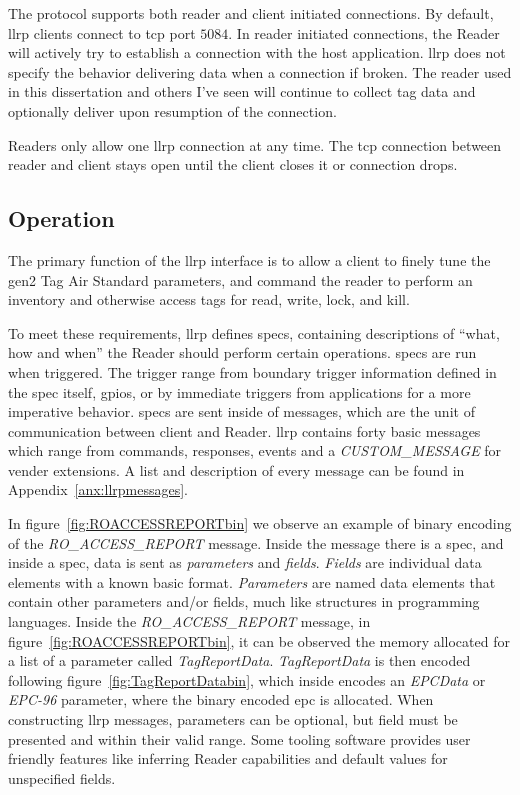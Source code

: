The protocol supports both reader and client initiated connections. By default, \ac{llrp} clients connect to \acs{tcp} port $5084$. In reader initiated connections, the Reader will actively try to establish a connection with the host application.
\ac{llrp} does not specify the behavior delivering data when a connection if broken. The reader used in this dissertation and others I've seen will continue to collect tag data and optionally deliver upon resumption of the connection.

Readers only allow one \ac{llrp} connection at any time. The \ac{tcp} connection between reader and client stays open until the client closes it or connection drops.

\subsection{Operation}

The primary function of the \ac{llrp} interface is to allow a client to finely tune the \ac{gen2} Tag Air Standard parameters, and command the reader to perform an inventory and otherwise access tags for read, write, lock, and kill.

To meet these requirements, \ac{llrp} defines \acp{spec}, containing descriptions of ``what, how and when'' the Reader should perform certain operations.
\acp{spec} are run when triggered. The trigger range from boundary trigger information defined in the \ac{spec} itself, \acp{gpio}, or by immediate triggers from applications for a more imperative behavior.
\acp{spec} are sent inside of messages, which are the unit of communication between client and Reader.
\ac{llrp} contains forty basic messages which range from commands, responses, events and a \textit{CUSTOM\_MESSAGE} for vender extensions. A list and description of every message can be found in Appendix~\ref{anx:llrpmessages}.

In figure~\ref{fig:ROACCESSREPORTbin} we observe an example of binary encoding of the \textit{RO\_ACCESS\_REPORT} message.
Inside the message there is a \ac{spec}, and inside a \ac{spec}, data is sent as \emph{parameters} and \emph{fields}.
\emph{Fields} are individual data elements with a known basic format.
\emph{Parameters} are named data elements that contain other parameters and/or fields, much like structures in programming languages.
Inside the \textit{RO\_ACCESS\_REPORT} message, in figure~\ref{fig:ROACCESSREPORTbin}, it can be observed the memory allocated for a list of a parameter called \textit{TagReportData}. \textit{TagReportData} is then encoded following figure~\ref{fig:TagReportDatabin}, which inside encodes an \textit{EPCData} or \textit{EPC-96} parameter, where the binary encoded \ac{epc} is allocated.
When constructing \ac{llrp} messages, parameters can be optional, but field must be presented and within their valid range. Some tooling software provides user friendly features like inferring Reader capabilities and default values for unspecified fields.

